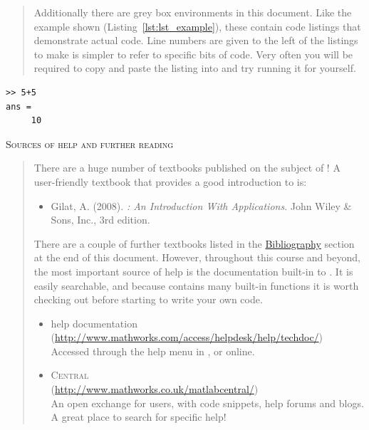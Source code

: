 \begin{quote}
Additionally there are grey box environments in this document. Like the example shown (Listing~\ref{lst:lst_example}), these contain code listings that demonstrate actual \mlab code. Line numbers are given to the left of the listings to make is simpler to refer to specific bits of code. Very often you will be required to copy and paste the listing into \mlab and try running it for yourself.
\end{quote}
\begin{lstlisting}[caption={Example of a code listing},label=lst:lst_example]	 
>> 5+5
ans =
	 10
\end{lstlisting}
\vspace{5mm}

\textsc{Sources of help and further reading}
\begin{quote}
There are a huge number of textbooks published on the subject of \mlab! A user-friendly textbook that provides a good introduction to \mlab is:
\begin{itemize}
\item Gilat, A. (2008). \textit{\mlab: An Introduction With Applications}. John Wiley \& Sons, Inc., 3rd edition. 
\end{itemize}
There are a couple of further textbooks listed in the \hyperref[app:bibliography]{Bibliography} section at the end of this document. However, throughout this course and beyond, the most important source of help is the documentation built-in to \mlab. It is easily searchable, and because \mlab contains many built-in functions it is worth checking out before starting to write your own code.
\begin{itemize}
\item \mlab help documentation\\(\href{http://www.mathworks.com/access/helpdesk/help/techdoc/}{http://www.mathworks.com/access/helpdesk/help/techdoc/})\\ Accessed through the help menu in \mlab, or online.
\item \mlab \textsc{Central}\\(\href{http://www.mathworks.co.uk/matlabcentral/}{http://www.mathworks.co.uk/matlabcentral/})\\An open exchange for users, with code snippets, help forums and blogs. A great place to search for specific help!
\end{itemize}
\end{quote}

